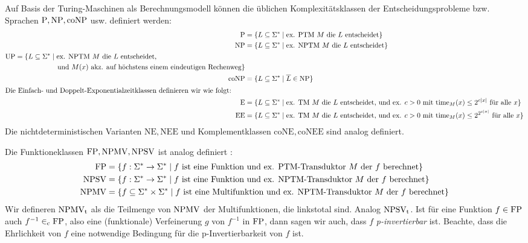 Auf Basis der Turing-Maschinen als Berechnungsmodell können die üblichen Komplexitätsklassen der Entscheidungsprobleme bzw. Sprachen $\mathrm{P}, \mathrm{NP}, \mathrm{coNP}$ usw. definiert werden:
\begin{align*}
    \mathrm{P} &= \{ L\subseteq\Sigma^* \mid \text{ex. PTM $M$ die $L$ entscheidet} \}\\
    \mathrm{NP} &= \{ L\subseteq\Sigma^* \mid \text{ex. NPTM $M$ die $L$ entscheidet} \}\\
\begin{split} \mathrm{UP} &= \{ L\subseteq\Sigma^* \mid  \text{ex. NPTM $M$ die $L$ entscheidet,}\\ &\qquad\qquad\qquad\text{und $M(x)$ akz. auf höchstens einem eindeutigen Rechenweg} \}\end{split}\\
    \mathrm{coNP} &= \{ L\subseteq\Sigma^* \mid \overline{L}\in\mathrm{NP} \}\\
\intertext{Die Einfach- und Doppelt-Exponentialzeitklassen definieren wir wie folgt:}
    \mathrm{E} &= \{ L\subseteq\Sigma^* \mid \text{ex. TM $M$ die $L$ entscheidet, und ex. $c>0$ mit $\mathrm{time}_M(x) \leq 2^{c|x|}$ für alle $x$} \}\\
    \mathrm{EE} &= \{ L\subseteq\Sigma^* \mid \text{ex. TM $M$ die $L$ entscheidet, und ex. $c>0$ mit $\mathrm{time}_M(x) \leq 2^{2^{c|x|}}$ für alle $x$} \}
\end{align*}
Die nichtdeterministischen Varianten $\mathrm{NE}, \mathrm{NEE}$ und Komplementklassen $\mathrm{coNE}, \mathrm{coNEE}$ sind analog definiert.

Die Funktioneklassen $\mathrm{FP}, \mathrm{NPMV}, \mathrm{NPSV}$ ist analog definiert \parencite{selman_taxonomy_1994}:
\begin{align*}
    \mathrm{FP} &= \{ f: \Sigma^*\to\Sigma^* \mid \text{$f$ ist eine Funktion und ex. PTM-Transduktor $M$ der $f$ berechnet} \}\\
    \mathrm{NPSV} &= \{ f:\Sigma^*\to\Sigma^* \mid \text{$f$ ist eine Funktion und ex. NPTM-Transduktor $M$ der $f$ berechnet} \}\\
    \mathrm{NPMV} &= \{ f\subseteq \Sigma^*\times\Sigma^* \mid \text{$f$ ist eine Multifunktion und ex. NPTM-Transduktor $M$ der $f$ berechnet} \}
\end{align*}
Wir defineren $\mathrm{NPMV_t}$ als die Teilmenge von $\mathrm{NPMV}$ der Multifunktionen, die linkstotal sind. Analog $\mathrm{NPSV_t}$.
Ist für eine Funktion $f\in\mathrm{FP}$ auch $f^{-1}\in_\mathrm{c} \mathrm{FP}$, also eine (funktionale) Verfeinerung $g$ von $f^{-1}$ in $\mathrm{FP}$, dann sagen wir auch, dass $f$ \emph{p-invertierbar} ist. Beachte, dass die Ehrlichkeit von $f$ eine notwendige Bedingung für die p-Invertierbarkeit von $f$ ist.

